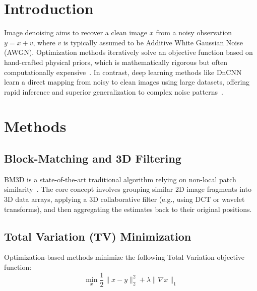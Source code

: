\begin{abstract}
This report provides a comparative analysis of five distinct image denoising algorithms: Block-Matching and 3D filtering (BM3D), three iterative optimization methods (ISTA, FISTA, ADMM) solving the Total Variation (TV) model, and a deep learning approach (DnCNN). Experiments demonstrate that DnCNN achieves the highest restoration quality while maintaining rapid inference speeds, significantly outperforming traditional optimization frameworks.
\end{abstract}

\section{Introduction}
Image denoising aims to recover a clean image $x$ from a noisy observation $y = x + v$, where $v$ is typically assumed to be Additive White Gaussian Noise (AWGN). Optimization methods iteratively solve an objective function based on hand-crafted physical priors, which is mathematically rigorous but often computationally expensive~\cite{osher2005iterative}. In contrast, deep learning methods like DnCNN learn a direct mapping from noisy to clean images using large datasets, offering rapid inference and superior generalization to complex noise patterns~\cite{zhang2017beyond}.

\section{Methods}
\subsection{Block-Matching and 3D Filtering}
BM3D is a state-of-the-art traditional algorithm relying on non-local patch similarity~\cite{dabov2007image}. The core concept involves grouping similar 2D image fragments into 3D data arrays, applying a 3D collaborative filter (e.g., using DCT or wavelet transforms), and then aggregating the estimates back to their original positions.

\subsection{Total Variation (TV) Minimization}
Optimization-based methods minimize the following Total Variation objective function:
\begin{equation}
\min_x \frac{1}{2}\|x-y\|_2^2 + \lambda \|\nabla x\|_1
\end{equation}

